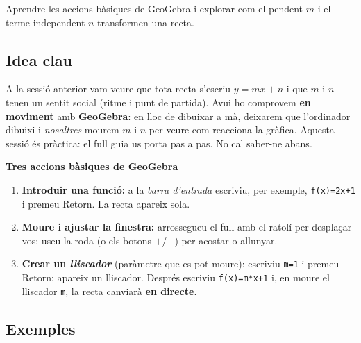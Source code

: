 %
{Aprendre les accions bàsiques de GeoGebra i explorar com el pendent $m$ i el terme independent $n$ transformen una recta.}

\subsection{Idea clau}

A la sessió anterior vam veure que tota recta s'escriu $y=mx+n$ i que $m$ i $n$ tenen
un sentit social (ritme i punt de partida). Avui ho comprovem \textbf{en moviment}
amb \textbf{GeoGebra}: en lloc de dibuixar a mà, deixarem que l'ordinador dibuixi i
\emph{nosaltres} mourem $m$ i $n$ per veure com reacciona la gràfica. Aquesta sessió
és pràctica: el full guia us porta pas a pas. No cal saber-ne abans.

\begin{idea}
\textbf{Tres accions bàsiques de GeoGebra}
\begin{enumerate}[leftmargin=1.6em, itemsep=2pt]
  \item \textbf{Introduir una funció:} a la \emph{barra d'entrada} escriviu, per
        exemple, \texttt{f(x)=2x+1} i premeu \textsf{Retorn}. La recta apareix sola.
  \item \textbf{Moure i ajustar la finestra:} arrossegueu el full amb el ratolí per
        desplaçar-vos; useu la roda (o els botons $+$/$-$) per acostar o allunyar.
  \item \textbf{Crear un \emph{lliscador}} (paràmetre que es pot moure): escriviu
        \texttt{m=1} i premeu \textsf{Retorn}; apareix un lliscador. Després escriviu
        \texttt{f(x)=m*x+1} i, en moure el lliscador \texttt{m}, la recta canviarà
        \textbf{en directe}.
\end{enumerate}
\end{idea}

\subsection{Exemples}

